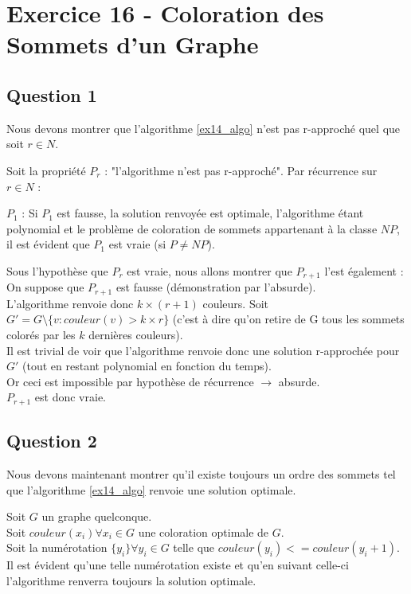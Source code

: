 
\section{Exercice 16 - Coloration des Sommets d'un Graphe}\label{ex16}

\subsection{Question 1}\label{ex16_q1}
Nous devons montrer que l'algorithme \ref{ex14_algo} n'est pas r-approch\'e quel que soit
$r \in N$.

Soit la propri\'et\'e $P_r$ : "l'algorithme n'est pas r-approch\'e".
Par r\'ecurrence sur $r \in N$ :

$P_1$ : Si $P_1$ est fausse, la solution renvoy\'ee est optimale, l'algorithme \'etant polynomial et le
probl\`eme de coloration de sommets appartenant \`a la classe $NP$, il est \'evident que
$P_1$ est vraie (si $P \neq NP$).

Sous l'hypoth\`ese que $P_r$ est vraie, nous allons montrer que $P_{r+1}$ l'est
\'egalement :\\
On suppose que $P_{r+1}$ est fausse (d\'emonstration par l'absurde).\\
L'algorithme renvoie donc $k \times (r+1)$ couleurs.
Soit $G' = G \setminus \{v : couleur(v) > k \times r\}$ (c'est \`a dire qu'on retire de G
tous les sommets color\'es par les $k$ derni\`eres couleurs).\\
Il est trivial de voir que l'algorithme renvoie donc une solution r-approch\'ee pour
$G'$ (tout en restant polynomial en fonction du temps).\\
Or ceci est impossible par hypoth\`ese de r\'ecurrence $\rightarrow$ absurde.\\
$P_{r+1}$ est donc vraie.

\subsection{Question 2}\label{ex16_q2}
Nous devons maintenant montrer qu'il existe toujours un ordre des sommets tel que
l'algorithme \ref{ex14_algo} renvoie une solution optimale.

Soit $G$ un graphe quelconque.\\
Soit $couleur(x_i) \forall x_i \in G$ une coloration optimale de $G$.\\
Soit la num\'erotation $\{y_i\} \forall y_i \in G$ telle que $couleur(y_i) <=
couleur(y_i+1)$.\\
Il est \'evident qu'une telle num\'erotation existe et qu'en suivant celle-ci
l'algorithme renverra toujours la solution optimale.


